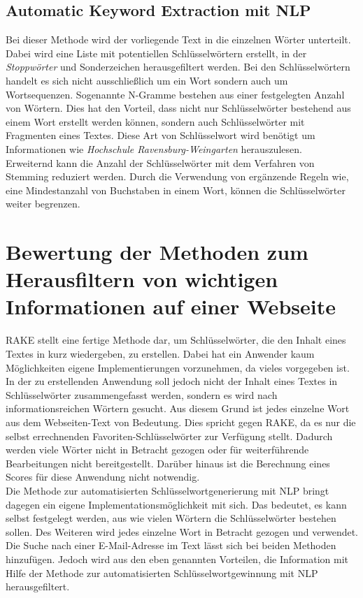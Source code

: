 	\subsection{Automatic Keyword Extraction mit NLP}
	\label{sec:Automatic Keyword Extraction}
	Bei dieser Methode wird der vorliegende Text in die einzelnen Wörter unterteilt. Dabei wird eine Liste mit potentiellen Schlüsselwörtern erstellt, in der \textit{Stoppwörter} und Sonderzeichen herausgefiltert werden. Bei den Schlüsselwörtern handelt es sich nicht ausschließlich um ein Wort sondern auch um Wortsequenzen. Sogenannte N-Gramme bestehen aus einer festgelegten Anzahl von Wörtern. Dies hat den Vorteil, dass nicht nur Schlüsselwörter bestehend aus einem Wort erstellt werden können, sondern auch Schlüsselwörter mit Fragmenten eines Textes. Diese Art von Schlüsselwort wird benötigt um Informationen wie \textit{Hochschule Ravensburg-Weingarten} herauszulesen.\\
	Erweiternd kann die Anzahl der Schlüsselwörter mit dem Verfahren von Stemming reduziert werden. Durch die Verwendung von ergänzende Regeln wie, eine Mindestanzahl von Buchstaben in einem Wort, können die Schlüsselwörter weiter begrenzen.

 

\section{Bewertung der Methoden zum Herausfiltern von wichtigen Informationen auf einer Webseite}
RAKE stellt eine fertige Methode dar, um Schlüsselwörter, die den Inhalt eines Textes in kurz wiedergeben, zu erstellen. Dabei hat ein Anwender kaum Möglichkeiten eigene Implementierungen vorzunehmen, da vieles vorgegeben ist. In der zu erstellenden Anwendung soll jedoch nicht der Inhalt eines Textes in Schlüsselwörter zusammengefasst werden, sondern es wird nach informationsreichen Wörtern gesucht. Aus diesem Grund ist jedes einzelne Wort aus dem Webseiten-Text von Bedeutung. Dies spricht gegen RAKE, da es nur die selbst errechnenden Favoriten-Schlüsselwörter zur Verfügung stellt. Dadurch werden viele Wörter nicht in Betracht gezogen oder für weiterführende Bearbeitungen nicht bereitgestellt. Darüber hinaus ist die Berechnung eines Scores für diese Anwendung nicht notwendig.\\
Die Methode zur automatisierten Schlüsselwortgenerierung mit NLP bringt dagegen ein eigene Implementationsmöglichkeit mit sich. Das bedeutet, es kann selbst festgelegt werden, aus wie vielen Wörtern die Schlüsselwörter bestehen sollen. Des Weiteren wird jedes einzelne Wort in Betracht gezogen und verwendet.\\ Die Suche nach einer E-Mail-Adresse im Text lässt sich bei beiden Methoden hinzufügen. Jedoch wird aus den eben genannten Vorteilen, die Information mit Hilfe der Methode zur automatisierten Schlüsselwortgewinnung mit NLP herausgefiltert.


